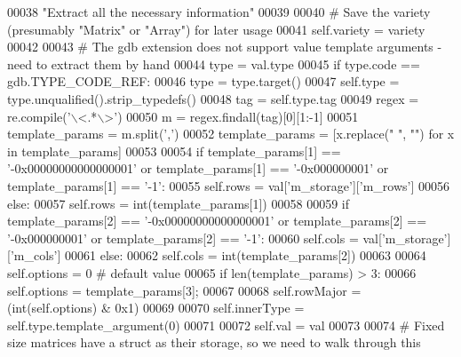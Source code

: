 \begin{DoxyCode}
00038         \textcolor{stringliteral}{"Extract all the necessary information"}
00039         
00040         \textcolor{comment}{# Save the variety (presumably "Matrix" or "Array") for later usage}
00041         self.variety = variety
00042         
00043         \textcolor{comment}{# The gdb extension does not support value template arguments - need to extract them by hand}
00044         type = val.type
00045         \textcolor{keywordflow}{if} type.code == gdb.TYPE\_CODE\_REF:
00046             type = type.target()
00047         self.type = type.unqualified().strip\_typedefs()
00048         tag = self.type.tag
00049         regex = re.compile(\textcolor{stringliteral}{'\(\backslash\)<.*\(\backslash\)>'})
00050         m = regex.findall(tag)[0][1:-1]
00051         template\_params = m.split(\textcolor{stringliteral}{','})
00052         template\_params = [x.replace(\textcolor{stringliteral}{" "}, \textcolor{stringliteral}{""}) \textcolor{keywordflow}{for} x \textcolor{keywordflow}{in} template\_params]
00053         
00054         \textcolor{keywordflow}{if} template\_params[1] == \textcolor{stringliteral}{'-0x00000000000000001'} \textcolor{keywordflow}{or} template\_params[1] == \textcolor{stringliteral}{'-0x000000001'} \textcolor{keywordflow}{or} 
      template\_params[1] == \textcolor{stringliteral}{'-1'}:
00055             self.rows = val[\textcolor{stringliteral}{'m\_storage'}][\textcolor{stringliteral}{'m\_rows'}]
00056         \textcolor{keywordflow}{else}:
00057             self.rows = int(template\_params[1])
00058         
00059         \textcolor{keywordflow}{if} template\_params[2] == \textcolor{stringliteral}{'-0x00000000000000001'} \textcolor{keywordflow}{or} template\_params[2] == \textcolor{stringliteral}{'-0x000000001'} \textcolor{keywordflow}{or} 
      template\_params[2] == \textcolor{stringliteral}{'-1'}:
00060             self.cols = val[\textcolor{stringliteral}{'m\_storage'}][\textcolor{stringliteral}{'m\_cols'}]
00061         \textcolor{keywordflow}{else}:
00062             self.cols = int(template\_params[2])
00063         
00064         self.options = 0 \textcolor{comment}{# default value}
00065         \textcolor{keywordflow}{if} len(template\_params) > 3:
00066             self.options = template\_params[3];
00067         
00068         self.rowMajor = (int(self.options) & 0x1)
00069         
00070         self.innerType = self.type.template\_argument(0)
00071         
00072         self.val = val
00073         
00074         \textcolor{comment}{# Fixed size matrices have a struct as their storage, so we need to walk through this}

\end{DoxyCode}

